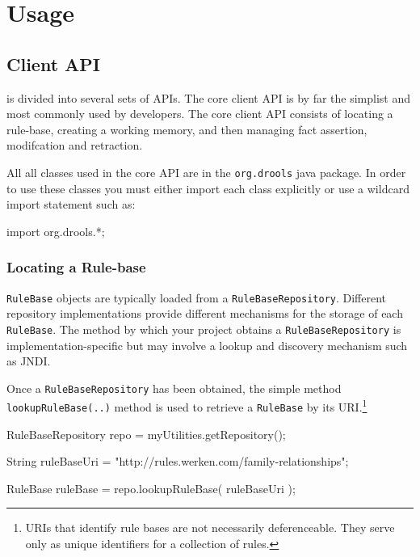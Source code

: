 \chapter{Usage}

\section{\drools{} Client API}

\drools{} is divided into several sets of APIs.  The core client API
is by far the simplist and most commonly used by developers.  The
core \drools{} client API consists of locating a rule-base, creating
a working memory, and then managing fact assertion, modifcation and
retraction.

All all classes used in the core \drools{} API are in the
\verb|org.drools| java package.  In order to use these classes
you must either import each class explicitly or use a wildcard
import statement such as:

\bigskip
\begin{codelisting}
import org.drools.*;
\end{codelisting}

\subsection{Locating a Rule-base}

\verb|RuleBase| objects are typically loaded from a
\verb|RuleBaseRepository|.  Different repository implementations
provide different mechanisms for the storage of each
\verb|RuleBase|.  The method by which your project obtains
a \verb|RuleBaseRepository| is implementation-specific but
may involve a lookup and discovery mechanism such as JNDI.

Once a \verb|RuleBaseRepository| has been obtained, the
simple method\\ \verb|lookupRuleBase(..)| method is used
to retrieve a \verb|RuleBase| by its URI.\footnote{URIs that
identify rule bases are not necessarily deferenceable.  They
serve only as unique identifiers for a collection of rules.}

\bigskip
\begin{codelisting}
RuleBaseRepository repo = myUtilities.getRepository();

String ruleBaseUri = "http://rules.werken.com/family-relationships";

RuleBase ruleBase = repo.lookupRuleBase( ruleBaseUri );
\end{codelisting}


